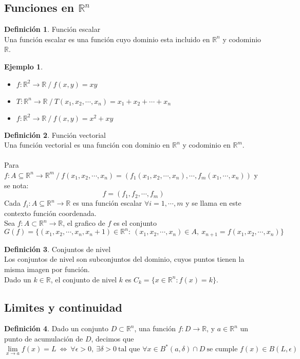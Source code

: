 \documentclass[10pt]{article}
\theoremstyle{definition}
\newtheorem{definition}{Definición}[section]
\newtheorem{example}{Ejemplo}[section]
\begin{document}
\subsection{Funciones en $\mathbb{R}^n$}
\begin{definition}{Función escalar}
	\\Una función escalar es una función cuyo dominio esta incluido en $\mathbb{R}^n$ y codominio $\mathbb{R}$.
\end{definition}
\begin{example}{ \ }
    \begin{itemize}
        \item $f:\mathbb{R}^2\to\mathbb{R}\ /\ f(x,y)=xy$
        \item $T:\mathbb{R}^n\to\mathbb{R}\ /\ T(x_1,x_2,\cdots,x_n)=x_1+x_2+\cdots+x_n$
        \item $f:\mathbb{R}^2\to\mathbb{R}\ /\ f(x,y)=x^2+xy$
    \end{itemize}
\end{example}
\begin{definition}{Función vectorial}
	\\Una función vectorial es una función con dominio en $\mathbb{R}^n$ y codominio en $\mathbb{R}^m$.\\
    \\Para $f:A\subseteq\mathbb{R}^n\to\mathbb{R}^m\ /\ f(x_1,x_2,\cdots,x_n)=(f_1(x_1,x_2,\cdots,x_n),\cdots,f_m(x_1,\cdots,x_n))$ y se nota: $$f=(f_1,f_2,\cdots,f_m)$$
Cada $f_i:A\subseteq\mathbb{R}^n\to\mathbb{R}$ es una función escalar $\forall i=1,\cdots,m$ y se llama en este contexto función coordenada.
\\Sea $f:A\subset\mathbb{R}^n\to\mathbb{R}$, el grafico de $f$ es el conjunto $$G(f)=\{(x_1,x_2,\cdots,x_n,x_n+1)\in\mathbb{R}^n:\ (x_1,x_2,\cdots,x_n)\in A,\ x_{n+1}=f(x_1,x_2,\cdots,x_n)\}$$
\end{definition}
\begin{definition}{Conjuntos de nivel}
    \\Los conjuntos de nivel son subconjuntos del dominio, cuyos puntos tienen la misma imagen por función.
    \\Dado un $k\in\mathbb{R}$, el conjunto de nivel $k$ es $C_k=\{x\in\mathbb{R}^n : f(x)=k\}$.
\end{definition}
\newpage\subsection{Limites y continuidad}
\begin{definition}
    Dado un conjunto $D\subset\mathbb{R}^n$, una función $f:D\to\mathbb{R}$, y $a\in\mathbb{R}^n$ un punto de acumulación de $D$, decimos que $$\lim_{x \to a}f(x)=L\ \Leftrightarrow\ \forall\epsilon>0,\ \exists\delta>0\ \text{tal que }\forall x\in B^*(a,\delta)\cap D\ \text{se cumple }f(x)\in B(L,\epsilon)$$
\end{definition}
\end{document}
